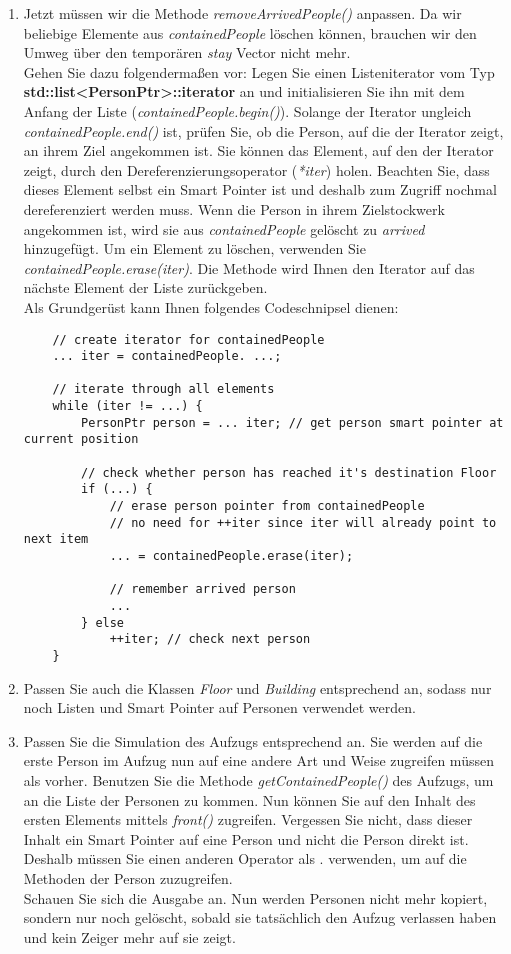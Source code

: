 \documentclass[
  accentcolor=tud1c,	%
  colorbacktitle,		%
  inverttitle,			%
  german,				%
  twoside
]{tudexercise}
\begin{document}
\begin{enumerate}
\item
Jetzt müssen wir die Methode \emph{removeArrivedPeople()} anpassen. Da wir beliebige Elemente aus \emph{containedPeople} löschen können, brauchen wir den Umweg über den temporären \emph{stay} Vector nicht mehr. \\

Gehen Sie dazu folgendermaßen vor: Legen Sie einen Listeniterator vom Typ \textbf{std::list<PersonPtr>::iterator} an und initialisieren Sie ihn mit dem Anfang der Liste (\emph{containedPeople.begin()}). Solange der Iterator ungleich \emph{containedPeople.end()} ist, prüfen  Sie, ob die Person, auf die der Iterator zeigt, an ihrem Ziel angekommen ist. Sie können das Element, auf den der Iterator zeigt, durch den Dereferenzierungsoperator (\emph{*iter}) holen. Beachten Sie, dass dieses Element selbst ein Smart Pointer ist und deshalb zum Zugriff nochmal dereferenziert werden muss. Wenn die Person in ihrem Zielstockwerk angekommen ist, wird sie aus \emph{containedPeople} gelöscht zu \emph{arrived} hinzugefügt. Um ein Element zu löschen, verwenden Sie \emph{containedPeople.erase(iter)}. Die Methode wird Ihnen den Iterator auf das nächste Element der Liste zurückgeben.\\

Als Grundgerüst kann Ihnen folgendes Codeschnipsel dienen:

\begin{lstlisting}
	// create iterator for containedPeople
	... iter = containedPeople. ...;
	
	// iterate through all elements
	while (iter != ...) {
		PersonPtr person = ... iter; // get person smart pointer at current position
		
		// check whether person has reached it's destination Floor
		if (...) {
			// erase person pointer from containedPeople
			// no need for ++iter since iter will already point to next item
			... = containedPeople.erase(iter);
			
			// remember arrived person 
			...
		} else
			++iter; // check next person
	}
\end{lstlisting}

\item Passen Sie auch die Klassen \emph{Floor} und \emph{Building} entsprechend an, sodass nur noch Listen und Smart Pointer auf Personen verwendet werden.

\item
Passen Sie die Simulation des Aufzugs entsprechend an. Sie werden auf die erste Person im Aufzug nun auf eine andere Art und Weise zugreifen müssen als vorher. Benutzen Sie die Methode \emph{getContainedPeople()} des Aufzugs, um an die Liste der Personen zu kommen. Nun können Sie auf den Inhalt des ersten Elements mittels \emph{front()} zugreifen. Vergessen Sie nicht, dass dieser Inhalt ein Smart Pointer auf eine Person und nicht die Person direkt ist. Deshalb müssen Sie einen anderen Operator als $.$ verwenden, um auf die Methoden der Person zuzugreifen. \\

Schauen Sie sich die Ausgabe an. Nun werden Personen nicht mehr kopiert, sondern nur noch gelöscht, sobald sie tatsächlich den Aufzug verlassen haben und kein Zeiger mehr auf sie zeigt.

\end{enumerate}
\end{document}
